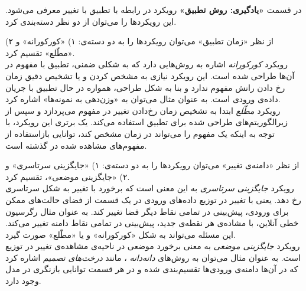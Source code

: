 
در قسمت 
\textbf{
«یادگیری: روش تطبیق»
} 
رویکرد در رابطه با تطبیق با تغییر معرفی می‌شود. این رویکردها را می‌توان از دو نظر دسته‌بندی کرد.


از نظر «زمان تطبیق» می‌توان رویکردها را به دو دسته‌ی: ۱) «کورکورانه» و ۲) «مطّلع» تقسیم کرد.\\
رویکرد 
\textit{
کورکورانه
} 
اشاره به روش‌هایی دارد که به شکلی ضمنی، تطبیق با مفهوم در آن‌ها طراحی شده است. این رویکرد نیازی به مشخص کردن و یا تشخیص دقیق زمان رخ دادن رانش مفهوم ندارد و بنا به شکل طراحی، همواره در حال تطبیق با جریان داده‌ی ورودی است. به عنوان مثال می‌توان به «وزن‌دهی به نمونه‌ها» اشاره کرد.\\
رویکرد 
\textit{
مطّلع
} 
ابتدا به تشخیص زمان رخ‌دادن تغییر در مفهوم می‌پردازد و سپس از زیرالگوریتم‌های طراحی شده برای تطبیق استفاده می‌کند. یک برتری این رویکرد، با توجه به اینکه یک مفهوم را می‌تواند در زمان مشخص کند، توانایی بازاستفاده از مفهوم‌های مشاهده شده در گذشته است.


از نظر «دامنه‌ی تغییر» می‌توان رویکردها را به دو دسته‌ی: ۱) «جایگزینی سرتاسری» و ۲) «جایگزینی موضعی»، تقسیم کرد.\\
رویکرد 
\textit{
جایگزینی سرتاسری
} 
به این معنی است که برخورد با تغییر به شکل سرتاسری رخ دهد. یعنی با تغییر در توزیع داده‌های ورودی در یک قسمت از فضای حالت‌های ممکن برای ورودی، پیش‌بینی در تمامی نقاط دیگر فضا تغییر کند. به عنوان مثال رگرسیون خطی آنلاین، با مشاده‌ی هر نقطه‌ی جدید، پیش‌بینی در تمامی نقاط دامنه تغییر می‌کند. این مسئله می‌تواند به شکل «کورکورانه» و یا «مطّلع» صورت گیرد.\\
رویکرد 
\textit{
جایگزینی موضعی
} 
به معنی برخورد موضعی در ناحیه‌ی مشاهده‌ی تغییر در توزیع است. به عنوان مثال می‌توان به روش‌های 
\textit{
دانه‌دانه
}، 
مانند 
\textit{
درخت‌های تصمیم
} 
اشاره کرد که در آن‌ها دامنه‌ی ورودی‌ها تقسیم‌بندی شده و در هر قسمت توانایی بازنگری در مدل وجود دارد.


